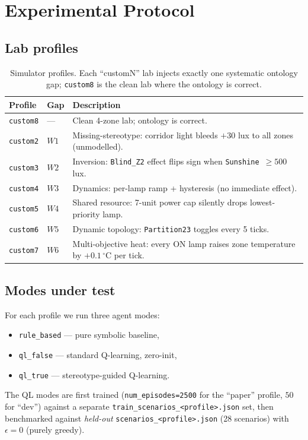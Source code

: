 \documentclass[conference]{IEEEtran}
\begin{document}
\section{Experimental Protocol}
\label{sec:protocol}

\subsection{Lab profiles}

\begin{table}[h]
\caption{Simulator profiles. Each ``customN'' lab injects exactly one
systematic ontology gap; \texttt{custom8} is the clean lab where the
ontology is correct.}
\label{tab:profiles}
\centering
\footnotesize
\begin{tabular}{@{}llp{4.5cm}@{}}
\toprule
Profile & Gap & Description \\
\midrule
\texttt{custom8} & ---  & Clean 4-zone lab; ontology is correct.\\
\texttt{custom2} & $W1$ & Missing-stereotype: corridor light bleeds $+30$ lux to all zones (unmodelled).\\
\texttt{custom3} & $W2$ & Inversion: \texttt{Blind\_Z2} effect flips sign when \texttt{Sunshine}~$\geq 500$ lux.\\
\texttt{custom4} & $W3$ & Dynamics: per-lamp ramp + hysteresis (no immediate effect).\\
\texttt{custom5} & $W4$ & Shared resource: 7-unit power cap silently drops lowest-priority lamp.\\
\texttt{custom6} & $W5$ & Dynamic topology: \texttt{Partition23} toggles every 5 ticks.\\
\texttt{custom7} & $W6$ & Multi-objective heat: every ON lamp raises zone temperature by $+0.1\,^{\circ}\!$C per tick.\\
\bottomrule
\end{tabular}
\end{table}

\subsection{Modes under test}
For each profile we run three agent modes:
\begin{itemize}
  \item \verb|rule_based| --- pure symbolic baseline,
  \item \verb|ql_false| --- standard Q-learning, zero-init,
  \item \verb|ql_true|  --- stereotype-guided Q-learning.
\end{itemize}
The QL modes are first trained
(\verb|num_episodes=2500| for the ``paper'' profile, $50$ for ``dev'')
against a separate \verb|train_scenarios_<profile>.json| set,
then benchmarked against \emph{held-out} \verb|scenarios_<profile>.json|
(28 scenarios) with $\epsilon=0$ (purely greedy).
\end{document}

